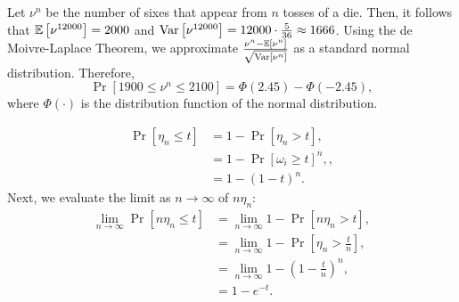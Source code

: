 \begin{problem}{5}
\end{problem}
\begin{solution}
    Let $\nu^n$ be the number of sixes that appear from $n$ tosses of a die. Then, it follows that $\mathbb{E}\left[\nu^{12000}\right] = 2000$ and $\operatorname{Var}\left[{\nu^{12000}}\right] = 12000\cdot\frac{5}{36} \approx 1666$. Using the de Moivre-Laplace Theorem, we approximate $\frac{\nu^n - \mathbb{E}\left[\nu^n\right]}{\sqrt{\operatorname{Var}[\nu^n]}}$ as a standard normal distribution. Therefore,
    \[\Pr[1900 \leq \nu^n \leq 2100] = \Phi(2.45) - \Phi(-2.45),\]
    where $\Phi(\cdot)$ is the distribution function of the normal distribution.
\end{solution}
\begin{problem}{6}
\end{problem}
\begin{solution}
    \begin{align*}
        \Pr[\eta_n \leq t] &= 1 - \Pr[\eta_n > t], \\
        &= 1 - \Pr[\omega_i \geq t]^n, \tag{by i.i.d.}, \\
        &= 1 - (1-t)^n.
    \end{align*}
    Next, we evaluate the limit as $n\to\infty$ of $n\eta_n$:
    \begin{align*}
        \lim_{n\to\infty} \Pr[n\eta_n \leq t] &= \lim_{n\to\infty} 1 - \Pr[n\eta_n > t], \\
        &= \lim_{n\to\infty} 1 - \Pr\left[\eta_n > \frac{t}{n}\right], \\
        &= \lim_{n\to\infty} 1 - \left(1 - \frac{t}{n}\right)^n, \\
        &= 1-e^{-t}.
    \end{align*}
\end{solution}
\begin{problem}{7}
    
\end{problem}
\begin{solution}
    
\end{solution}
\begin{problem}{8}
    
\end{problem}
\begin{solution}
    
\end{solution}

\begin{problem}{9}
\end{problem}
\begin{solution}
    
\end{solution}
